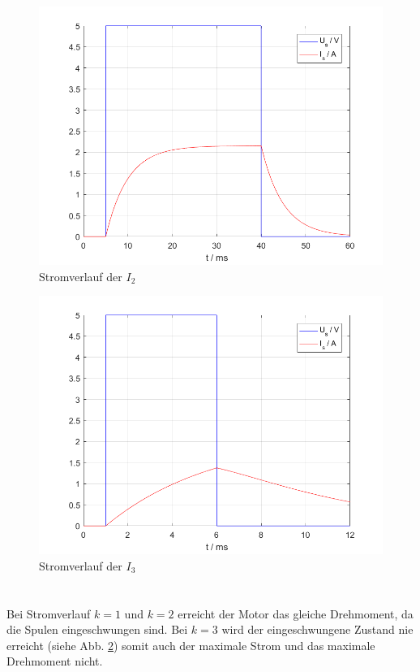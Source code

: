 \begin{figure}[htb]
	\includegraphics[width=\textwidth]{./Bilder/2a_Stromverlauf_2}
	\caption{Stromverlauf der $I_2$}
	\label{fig:2a_stromverlauf_I2}
\end{figure}

\begin{figure}[htb]
	\includegraphics[width=\textwidth]{./Bilder/2a_Stromverlauf_3}
	\caption{Stromverlauf der $I_3$}
	\label{fig:2a_stromverlauf_I3}
\end{figure}
%
\section{}\label{sec:aufg2b}

%
Bei Stromverlauf $k = 1$ und $k = 2$ erreicht der Motor das gleiche Drehmoment, da die Spulen eingeschwungen sind. Bei $k = 3$ wird der eingeschwungene Zustand nie erreicht (siehe Abb. \ref{fig:2a_stromverlauf_I3}) somit auch der maximale Strom und das maximale Drehmoment nicht. 
%

\clearpage
